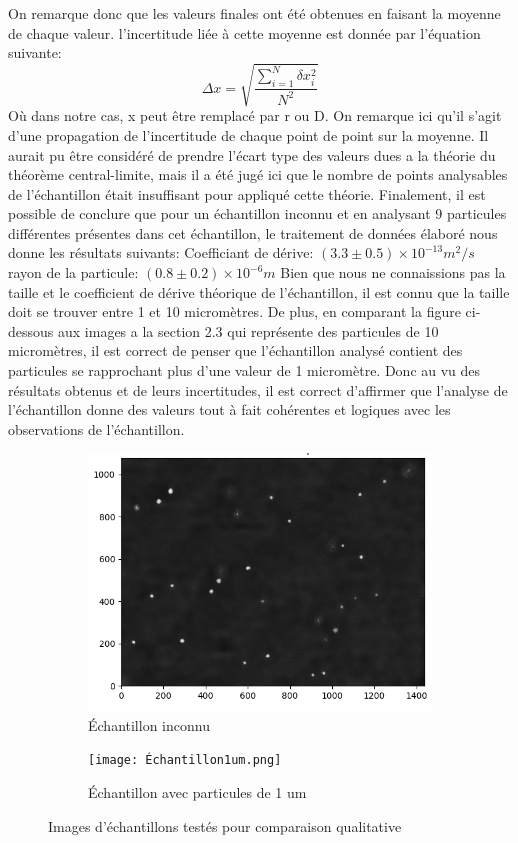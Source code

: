 \documentclass[11pt,letterpaper]{article}
\begin{document}
On remarque donc que les valeurs finales ont été obtenues en faisant la moyenne de chaque valeur. l'incertitude liée à cette moyenne est donnée
par l'équation suivante: 
\[
  \Delta x = \sqrt{\frac{\sum_{i=1}^N \delta x_{i}^2}{N^2}}
\]
Où dans notre cas, x peut être remplacé par r ou D. On remarque ici qu'il s'agit d'une propagation de l’incertitude de chaque point de point sur la 
moyenne. Il aurait pu être considéré de prendre l'écart type des valeurs dues a la théorie du théorème central-limite, mais il a été jugé ici que le nombre de points 
analysables de l’échantillon était insuffisant pour appliqué cette théorie. 
Finalement, il est possible de conclure que pour un échantillon inconnu et en analysant 9 particules différentes présentes dans cet échantillon, 
le traitement de données élaboré nous donne les résultats suivants: 
Coefficiant de dérive: $(3.3 \pm 0.5) \times 10^{-13} m^{2}/s$
rayon de la particule: $(0.8 \pm 0.2)\times 10^{-6} m$
Bien que nous ne connaissions pas la taille et le coefficient de dérive théorique de l'échantillon, il est connu que la taille doit se trouver 
entre 1 et 10 micromètres. De plus, en comparant  la figure ci-dessous aux images a la section 2.3 qui représente des particules de 10 micromètres, il est correct de penser 
que l'échantillon analysé contient des particules se rapprochant plus d'une valeur de 1 micromètre. Donc au vu des résultats obtenus et de leurs 
incertitudes, il est correct d'affirmer que l'analyse de l'échantillon donne des valeurs tout à fait cohérentes et logiques avec les observations de l'échantillon. 

\begin{figure}[H]
  \begin{subfigure}[H]{0.45\textwidth}
    \centering
    \includegraphics[width=\textwidth]{Test_cond_rapport.png}
    \caption{Échantillon inconnu}
  \end{subfigure}
  \hfill
  \begin{subfigure}[H]{0.45\textwidth}
    \centering
    \texttt{[image: Échantillon1um.png]}
    \caption{Échantillon avec particules de 1 um}
  \end{subfigure}
  \caption{Images d'échantillons testés pour comparaison qualitative}
\end{figure}
\end{document}
